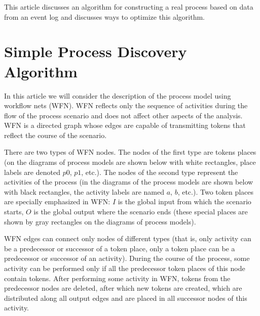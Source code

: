 \documentclass[
11pt,%
tightenlines,%
twoside,%
onecolumn,%
nofloats,%
nobibnotes,%
nofootinbib,%
superscriptaddress,%
noshowpacs,%
centertags]%
{revtex4}
\begin{document}
This article discusses an algorithm for constructing a real process based on data from an event log and discusses ways to optimize this algorithm.

\section{Simple Process Discovery Algorithm}

In this article we will consider the description of the process model using workflow nets (WFN).
WFN reflects only the sequence of activities during the flow of the process scenario and does not affect other aspects of the analysis.
WFN is a directed graph whose edges are capable of transmitting tokens that reflect the course of the scenario.

There are two types of WFN nodes.
The nodes of the first type are tokens places (on the diagrams of process models are shown below with white rectangles, place labels are denoted $p0$, $p1$, etc.).
The nodes of the second type represent the activities of the process (in the diagrams of the process models are shown below with black rectangles, the activity labels are named $a$, $b$, etc.).
Two token places are specially emphasized in WFN: $I$ is the global input from which the scenario starts, $O$ is the global output where the scenario ends (these special places are shown by gray rectangles on the diagrams of process models).

WFN edges can connect only nodes of different types (that is, only activity can be a predecessor or successor of a token place, only a token place can be a predecessor or successor of an activity).
During the course of the process, some activity can be performed only if all the predecessor token places of this node contain tokens.
After performing some activity in WFN, tokens from the predecessor nodes are deleted, after which new tokens are created, which are distributed along all output edges and are placed in all successor nodes of this activity.
\end{document}
